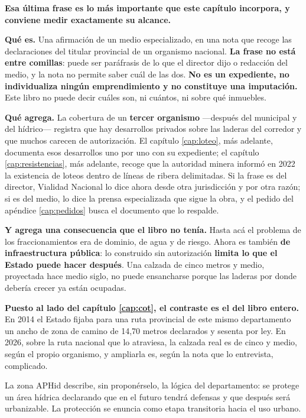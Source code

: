 \begin{cautela}
\textbf{Esa última frase es lo más importante que este capítulo incorpora, y conviene medir
exactamente su alcance.}

\textbf{Qué es.} Una afirmación de un medio especializado, en una nota que recoge las
declaraciones del titular provincial de un organismo nacional. \textbf{La frase no está entre
comillas}: puede ser paráfrasis de lo que el director dijo o redacción del medio, y la nota no
permite saber cuál de las dos. \textbf{No es un expediente, no individualiza ningún
emprendimiento y no constituye una imputación.} Este libro no puede decir cuáles son, ni
cuántos, ni sobre qué inmuebles.

\textbf{Qué agrega.} La cobertura de un \textbf{tercer organismo} ---después del municipal y del
hídrico--- registra que hay desarrollos privados sobre las laderas del corredor y que muchos carecen de
autorización. El capítulo \ref{cap:loteo}, más adelante, documenta esos desarrollos uno por uno con su
expediente; el capítulo \ref{cap:resistencias}, más adelante, recoge que la autoridad minera informó en 2022 la
existencia de loteos dentro de líneas de ribera delimitadas. Si la frase es del director,
Vialidad Nacional lo dice ahora desde otra jurisdicción y por otra razón; si es del medio, lo
dice la prensa especializada que sigue la obra, y el pedido del apéndice \ref{cap:pedidos}
busca el documento que lo respalde.

\textbf{Y agrega una consecuencia que el libro no tenía.} Hasta acá el problema de los
fraccionamientos era de dominio, de agua y de riesgo. Ahora es también \textbf{de
infraestructura pública}: lo construido sin autorización \textbf{limita lo que el Estado puede
hacer después}. Una calzada de cinco metros y medio, proyectada hace medio siglo, no puede
ensancharse porque las laderas por donde debería crecer ya están ocupadas.

\textbf{Puesto al lado del capítulo \ref{cap:cot}, el contraste es el del libro entero.} En 2014
el Estado fijaba para una ruta provincial de este mismo departamento un ancho de zona de camino
de 14,70 metros declarados y sesenta por ley. En 2026, sobre la ruta nacional que lo atraviesa,
la calzada real es de cinco y medio, según el propio organismo, y ampliarla es, según la nota
que lo entrevista, complicado.
\end{cautela}




La zona APHid describe, sin proponérselo, la lógica del departamento: se protege un área hídrica declarando que en el futuro tendrá defensas y que después será urbanizable. La protección se enuncia como etapa transitoria hacia el uso urbano.

